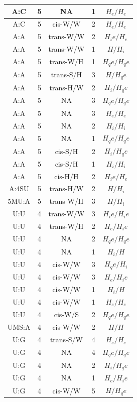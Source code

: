\begin{center}
\begin{longtable}{c|c|c|c|c}
A:C & 5 & NA & 1 & $H_e/H_e$ \\  \hline
A:C & 5 & cis-W/W & 2 & $H_e/H_e$ \\  \hline
A:A & 5 & trans-W/W & 2 & $H_ie/H_e$ \\  \hline
A:A & 5 & trans-W/W & 1 & $H/H_i$ \\  \hline
A:A & 5 & trans-W/H & 1 & $H_qe/H_qe$ \\  \hline
A:A & 5 & trans-S/H & 3 & $H/H_qe$ \\  \hline
A:A & 5 & trans-H/W & 2 & $H_i/H_qe$ \\  \hline
A:A & 5 & NA & 3 & $H_qe/H_qe$ \\  \hline
A:A & 5 & NA & 3 & $H_e/H_e$ \\  \hline
A:A & 5 & NA & 2 & $H_i/H_i$ \\  \hline
A:A & 5 & NA & 1 & $H_qe/H_qe$ \\  \hline
A:A & 5 & cis-S/H & 2 & $H_i/H_qe$ \\  \hline
A:A & 5 & cis-S/H & 1 & $H_i/H_i$ \\  \hline
A:A & 5 & cis-H/H & 2 & $H_ie/H_e$ \\  \hline
A:4SU & 5 & trans-H/W & 2 & $H/H_i$ \\  \hline
5MU:A & 5 & trans-W/H & 3 & $H/H_i$ \\  \hline
U:U & 4 & trans-W/W & 3 & $H_ie/H_ie$ \\  \hline
U:U & 4 & trans-W/H & 2 & $H_e/H_ie$ \\  \hline
U:U & 4 & NA & 2 & $H_qe/H_qe$ \\  \hline
U:U & 4 & NA & 1 & $H_i/H$ \\  \hline
U:U & 4 & cis-W/W & 3 & $H_qe/H_i$ \\  \hline
U:U & 4 & cis-W/W & 3 & $H_e/H_ie$ \\  \hline
U:U & 4 & cis-W/W & 1 & $H_i/H$ \\  \hline
U:U & 4 & cis-W/W & 1 & $H_e/H_e$ \\  \hline
U:U & 4 & cis-W/S & 2 & $H_qe/H_qe$ \\  \hline
UMS:A & 4 & cis-W/W & 2 & $H/H$ \\  \hline
U:G & 4 & trans-S/W & 4 & $H_e/H_e$ \\  \hline
U:G & 4 & NA & 4 & $H_qe/H_qe$ \\  \hline
U:G & 4 & NA & 2 & $H_i/H_qe$ \\  \hline
U:G & 4 & NA & 1 & $H_e/H_ie$ \\  \hline
U:G & 4 & cis-W/W & 5 & $H/H_qe$ \\  \hline

\end{longtable}
\end{center}
